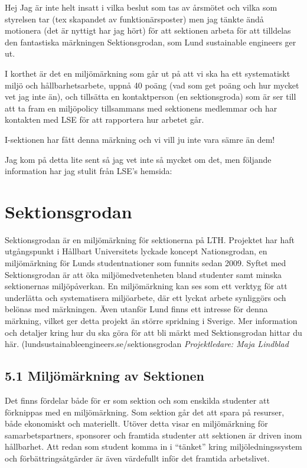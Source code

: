 \documentclass[../_main/handlingar.tex]{subfiles}
\begin{document}
Hej
Jag är inte helt insatt i vilka beslut som tas av årsmötet och vilka som styrelsen tar (tex skapandet av funktionärsposter) men jag tänkte ändå motionera (det är nyttigt har jag hört) för att sektionen arbeta för att tilldelas den fantastiska märkningen Sektionsgrodan, som Lund sustainable engineers ger ut.

I korthet är det en miljömärkning som går ut på att vi ska ha ett systematiskt miljö och hållbarhetsarbete, uppnå 40 poäng (vad som get poäng och hur mycket vet jag inte än), och tillsätta en kontaktperson (en sektionsgroda)  som är ser till att ta fram en miljöpolicy tillsammans med sektionens medlemmar och har kontakten med LSE för att rapportera hur arbetet går. 

I-sektionen har fått denna märkning och vi vill ju inte vara sämre än dem! 

Jag kom på detta lite sent så jag vet inte så mycket om det, men följande information har jag stulit från LSE's hemsida: 

\section*{Sektionsgrodan}
Sektionsgrodan är en miljömärkning för sektionerna på LTH. Projektet har haft utgångspunkt i Hållbart Universitets lyckade koncept Nationsgrodan, en miljömärkning för Lunds studentnationer som funnits sedan 2009. Syftet med Sektionsgrodan är att öka miljömedvetenheten bland studenter samt minska sektionernas miljöpåverkan. En miljömärkning kan ses som ett verktyg för att underlätta och systematisera miljöarbete, där ett lyckat arbete synliggörs och belönas med märkningen. Även utanför Lund finns ett intresse för denna märkning, vilket ger detta projekt än större spridning i Sverige. Mer information och detaljer kring hur du ska göra för att bli märkt med Sektionsgrodan hittar du här. (lundsustainableengineers.se/sektionsgrodan
\textit{Projektledare: Maja Lindblad}

\subsection*{5.1 Miljömärkning av Sektionen}
Det finns fördelar både för er som sektion och som enskilda studenter att förknippas med en miljömärkning. Som sektion går det att spara på resurser, både ekonomiskt och materiellt. Utöver detta visar en miljömärkning för samarbetspartners, sponsorer och framtida studenter att sektionen är driven inom hållbarhet. Att redan som student komma in i “tänket” kring miljöledningssystem och förbättringsåtgärder är även värdefullt inför det framtida arbetslivet.
\end{document}
